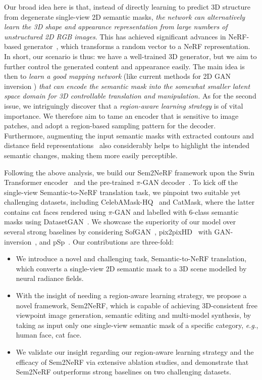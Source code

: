 \documentclass[runningheads]{llncs}
\newcommand{\eg}{\textit{e}.\textit{g}.}
\begin{document}
Our broad idea here is that, instead of directly learning to predict 3D structure from degenerate single-view 2D semantic masks, \emph{the network can alternatively learn the 3D shape and appearance representation from large numbers of unstructured 2D RGB images}. This has achieved significant advances in NeRF-based generator~\cite{schwarz2020graf,niemeyer2021giraffe,chan2021pi,gu2021stylenerf,chan2021efficient}, which transforms a random vector to a NeRF representation. In short, our scenario is thus: we have a well-trained 3D generator, but we aim to further control the generated content and appearance easily. The main idea is then to \emph{learn a good mapping network} (like current methods for 2D GAN inversion \cite{richardson2021encoding,song2021agilegan}) \emph{that can encode the semantic mask into the somewhat smaller latent space domain for 3D controllable translation and manipulation.} As for the second issue, we intriguingly discover that a \emph{region-aware learning strategy} is of vital importance. We therefore aim to tame an encoder that is sensitive to image patches, and adopt a region-based sampling pattern for the decoder. Furthermore, augmenting the input semantic masks with extracted contours and distance field representations~\cite{chen2018sketchygan} also considerably helps to highlight the intended semantic changes, making them more easily perceptible.
    

Following the above analysis, we build our Sem2NeRF framework upon the Swin Transformer encoder~\cite{liu2021swin} and the pre-trained $\pi$-GAN decoder~\cite{chan2021pi}. To kick off the single-view Semantic-to-NeRF translation task, we pinpoint two suitable yet challenging datasets, including CelebAMask-HQ~\cite{lee2020maskgan} and CatMask, where the latter contains cat faces rendered using $\pi$-GAN and labelled with 6-class semantic masks using DatasetGAN~\cite{zhang2021datasetgan}. We showcase the superiority of our model over several strong baselines by considering SofGAN~\cite{chen2022sofgan}, pix2pixHD~\cite{wang2018high} with GAN-inversion~\cite{karras2020analyzing}, and pSp~\cite{richardson2021encoding}. 
Our contributions are three-fold:
\begin{itemize}
  \item We introduce a novel and challenging task, Semantic-to-NeRF translation, which converts a single-view 2D semantic mask to a 3D scene modelled by neural radiance fields.
  \item With the insight of needing a region-aware learning strategy, we propose a novel framework, Sem2NeRF, which is capable of achieving 3D-consistent free viewpoint image generation, semantic editing and multi-model synthesis, by taking as input only one single-view semantic mask of a specific category, \eg, human face, cat face.
  \item We validate our insight regarding our region-aware learning strategy and the efficacy of Sem2NeRF via extensive ablation studies, and demonstrate that Sem2NeRF outperforms strong baselines on two challenging datasets. 
\end{itemize}
\end{document}
